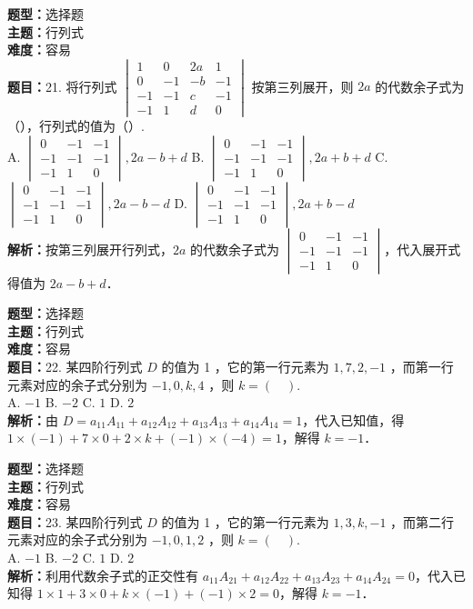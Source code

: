 \documentclass{ctexart}
\newenvironment{question}[5]{%
	\noindent\textbf{题型：}#1\\
	\textbf{主题：}#2\\
	\textbf{难度：}#3\\
	\textbf{题目：}#4\\
	\textbf{解析：}#5\\
	\vspace{1em}
}{}
\begin{document}
	\begin{question}
		{选择题}
		{行列式}
		{容易}
		{21. 将行列式 \(\begin{vmatrix}1 & 0 & 2a & 1 \\ 0 & -1 & -b & -1 \\ -1 & -1 & c & -1 \\ -1 & 1 & d & 0\end{vmatrix}\) 按第三列展开，则 \(2a\) 的代数余子式为（），行列式的值为（）. \\
			A. \(\begin{vmatrix}0 & -1 & -1 \\ -1 & -1 & -1 \\ -1 & 1 & 0\end{vmatrix}, 2a-b+d\) \quad
			B. \(\begin{vmatrix}0 & -1 & -1 \\ -1 & -1 & -1 \\ -1 & 1 & 0\end{vmatrix}, 2a+b+d\) \quad
			C. \(\begin{vmatrix}0 & -1 & -1 \\ -1 & -1 & -1 \\ -1 & 1 & 0\end{vmatrix}, 2a-b-d\) \quad
			D. \(\begin{vmatrix}0 & -1 & -1 \\ -1 & -1 & -1 \\ -1 & 1 & 0\end{vmatrix}, 2a+b-d\)}
		{按第三列展开行列式，\(2a\) 的代数余子式为 \(\begin{vmatrix}0 & -1 & -1 \\ -1 & -1 & -1 \\ -1 & 1 & 0\end{vmatrix}\)，代入展开式得值为 \(2a-b+d\)．}
	\end{question}
	
	
	\begin{question}
		{选择题}
		{行列式}
		{容易}
		{22. 某四阶行列式 \(D\) 的值为 1 ，它的第一行元素为 \(1,7,2,-1\) ，而第一行元素对应的余子式分别为 \(-1,0,k,4\) ，则 \(k=(\quad)\). \\
			A. \(-1\) \quad B. \(-2\) \quad C. \(1\) \quad D. \(2\)}
		{由 \(D = a_{11}A_{11} + a_{12}A_{12} + a_{13}A_{13} + a_{14}A_{14} = 1\)，代入已知值，得 \(1 \times (-1) + 7 \times 0 + 2 \times k + (-1) \times (-4) = 1\)，解得 \(k = -1\)．}
	\end{question}
	
	
	\begin{question}
		{选择题}
		{行列式}
		{容易}
		{23. 某四阶行列式 \(D\) 的值为 1 ，它的第一行元素为 \(1,3,k,-1\) ，而第二行元素对应的余子式分别为 \(-1,0,1,2\) ，则 \(k=(\quad)\). \\
			A. \(-1\) \quad B. \(-2\) \quad C. \(1\) \quad D. \(2\)}
		{利用代数余子式的正交性有 \(a_{11}A_{21} + a_{12}A_{22} + a_{13}A_{23} + a_{14}A_{24} = 0\)，代入已知得 \(1\times1 + 3\times0 + k\times(-1) + (-1)\times2 = 0\)，解得 \(k = -1\)．}
	\end{question}
	
\end{document}
